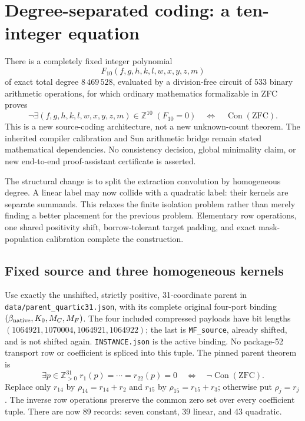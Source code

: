 \section{Degree-separated coding: a ten-integer equation}
\label{sec:degree-separated-sun}

There is a completely fixed integer polynomial
\[
 F_{10}(f,g,h,k,l,w,x,y,z,m)
\]
of exact total degree $8\,469\,528$, evaluated by a division-free circuit of
$533$ binary arithmetic operations, for which ordinary mathematics
formalizable in ZFC proves
\[
 \neg\exists(f,g,h,k,l,w,x,y,z,m)\in\mathbb Z^{10}\;(F_{10}=0)
 \quad\Longleftrightarrow\quad\operatorname{Con}(\mathrm{ZFC}).
\]
This is a new source-coding architecture, not a new unknown-count theorem.
The inherited compiler calibration and Sun arithmetic bridge remain stated
mathematical dependencies. No consistency decision, global minimality claim,
or new end-to-end proof-assistant certificate is asserted.

The structural change is to split the extraction convolution by homogeneous
degree. A linear label may now collide with a quadratic label: their kernels
are separate summands. This relaxes the finite isolation problem rather than
merely finding a better placement for the previous problem. Elementary row
operations, one shared positivity shift, borrow-tolerant target padding,
and exact mask-population calibration complete the construction.

\subsection{Fixed source and three homogeneous kernels}

Use exactly the unshifted, strictly positive, 31-coordinate parent in
\texttt{data/parent\_quartic31.json}, with its complete original four-port
binding $(\beta_{\rm native},K_0,M_C,M_F)$. The four included compressed
payloads have bit lengths $(1064921,1070004,1064921,1064922)$; the last is
\texttt{MF\_source}, already shifted, and is not shifted again.
\texttt{INSTANCE.json} is the active binding. No package-52 transport row or
coefficient is spliced into this tuple. The pinned parent theorem is
\[
 \exists p\in\mathbb Z_{>0}^{31}\;r_1(p)=\cdots=r_{22}(p)=0
 \quad\Longleftrightarrow\quad\neg\operatorname{Con}(\mathrm{ZFC}).
\]
Replace only $r_{14}$ by $\rho_{14}=r_{14}+r_2$ and $r_{15}$ by
$\rho_{15}=r_{15}+r_3$; otherwise put $\rho_j=r_j$. The inverse row
operations preserve the common zero set over every coefficient tuple.
There are now 89 records: seven constant, 39 linear, and 43 quadratic.

